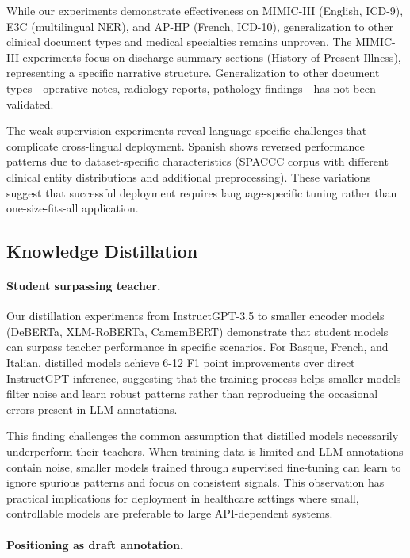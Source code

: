 While our experiments demonstrate effectiveness on MIMIC-III (English, ICD-9), E3C (multilingual NER), and AP-HP (French, ICD-10), generalization to other clinical document types and medical specialties remains unproven.
The MIMIC-III experiments focus on discharge summary sections (History of Present Illness), representing a specific narrative structure.
Generalization to other document types—operative notes, radiology reports, pathology findings—has not been validated.

The weak supervision experiments reveal language-specific challenges that complicate cross-lingual deployment.
Spanish shows reversed performance patterns due to dataset-specific characteristics (SPACCC corpus with different clinical entity distributions and additional preprocessing).
These variations suggest that successful deployment requires language-specific tuning rather than one-size-fits-all application.


\subsection{Knowledge Distillation}

\paragraph{Student surpassing teacher.}

Our distillation experiments from InstructGPT-3.5 to smaller encoder models (DeBERTa, XLM-RoBERTa, CamemBERT) demonstrate that student models can surpass teacher performance in specific scenarios.
For Basque, French, and Italian, distilled models achieve 6-12 F1 point improvements over direct InstructGPT inference, suggesting that the training process helps smaller models filter noise and learn robust patterns rather than reproducing the occasional errors present in LLM annotations.

This finding challenges the common assumption that distilled models necessarily underperform their teachers.
When training data is limited and LLM annotations contain noise, smaller models trained through supervised fine-tuning can learn to ignore spurious patterns and focus on consistent signals.
This observation has practical implications for deployment in healthcare settings where small, controllable models are preferable to large API-dependent systems.

\paragraph{Positioning as draft annotation.}

